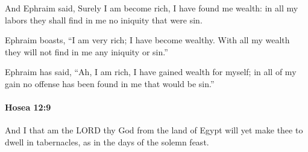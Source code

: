 			\begin{versebox}
					\item[BHS] 
					\item[LXX] 
					\item[ASV] And Ephraim said, Surely I am become rich, I have found me wealth: in all my labors they shall find in me no iniquity that were sin.
					\item[NIV] Ephraim boasts, “I am very rich; I have become wealthy. With all my wealth they will not find in me any iniquity or sin.”
					\item[NRSV] Ephraim has said, “Ah, I am rich, I have gained wealth for myself; in all of my gain no offense has been found in me that would be sin.”
			\end{versebox}

		\paragraph{Hosea 12:9} %
			\label{HOSEA-12-9}

			And I that am the LORD thy God from the land of Egypt will yet make thee to dwell in tabernacles, as in the days of the solemn feast.

